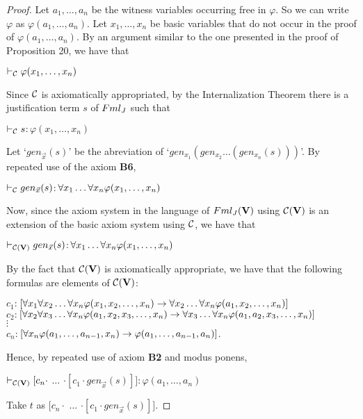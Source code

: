\begin{proof}
	Let $a_{1}, \dots, a_{n}$ be the witness variables occurring free in $\varphi$. So we can write $\varphi$ as $\varphi(a_{1}, \dots, a_{n})$. Let $x_{1}, \dots, x_{n}$ be basic variables that do not occur in the proof of $\varphi(a_{1}, \dots, a_{n})$. By an argument similar to the one presented in the proof of Proposition 20, we have that
	
	\begin{center}
		$\vdash_{\mathcal{C}} \varphi(x_{1}, \dots, x_{n})$
	\end{center}
	
	\qquad Since $\mathcal{C}$ is axiomatically appropriated, by the Internalization Theorem there is a justification term $s$ of $Fml_{J}$ such that
	
	\begin{center}
		$\vdash_{\mathcal{C}} s$$:$$\varphi(x_{1}, \dots, x_{n})$
	\end{center}
	
	\qquad Let `$gen_{\vec{x}}(s)$' be the abreviation of `$gen_{x_{1}}(gen_{x_{2}} \dots (gen_{x_{n}}(s)))$'. By repeated use of the axiom \textbf{B6},
	
	\begin{center}
		$\vdash_{\mathcal{C}} gen_{\vec{x}}(s)$$:$$\forall x_{1} \dots \forall x_{n} \varphi(x_{1}, \dots, x_{n})$
	\end{center}
	
	\qquad Now, since the axiom system in the language of $Fml_{J}(\textbf{V})$ using $\mathcal{C}(\textbf{V})$ is an extension of the basic axiom system using $\mathcal{C}$, we have that
	
	\begin{center}
		$\vdash_{\mathcal{C}(\textbf{V})} gen_{\vec{x}}(s)$$:$$\forall x_{1} \dots \forall x_{n} \varphi(x_{1}, \dots, x_{n})$
	\end{center}
	
	
	\qquad By the fact that $\mathcal{C}(\textbf{V})$ is axiomatically appropriate, we have that the following formulas are elements of $\mathcal{C}(\textbf{V})$: 
	
	
	\begin{center}
		$c_{1}$$:$$[\forall x_{1} \forall x_{2} \dots \forall x_{n} \varphi(x_{1},x_{2}, \dots, x_{n}) \rightarrow  \forall x_{2} \dots \forall x_{n} \varphi(a_{1},x_{2}, \dots, x_{n}) ]$\\
		$c_{2}$$:$$[\forall x_{2} \forall x_{3} \dots \forall x_{n} \varphi(a_{1},x_{2},x_{3}, \dots, x_{n}) \rightarrow  \forall x_{3} \dots \forall x_{n} \varphi(a_{1},a_{2},x_{3}, \dots, x_{n}) ]$\\
		$\vdots$\\
		$c_{n}$$:$$[\forall x_{n} \varphi(a_{1}, \dots, a_{n-1}, x_{n}) \rightarrow  \varphi(a_{1}, \dots, a_{n-1}, a_{n}) ]$.
	\end{center}
	
	\qquad Hence, by repeated use of axiom \textbf{B2} and modus ponens,
	
	
	\begin{center}
		$\vdash_{\mathcal{C}(\textbf{V})} [c_{n}\cdot$ $\dots$ $\cdot [c_{1} \cdot gen_{\vec{x}}(s)]]$$:$$\varphi(a_{1}, \dots, a_{n})$
	\end{center}
	
	\qquad Take $t$ as $[c_{n}\cdot$ $\dots$ $\cdot [c_{1} \cdot gen_{\vec{x}}(s)]]$. 
\end{proof}



